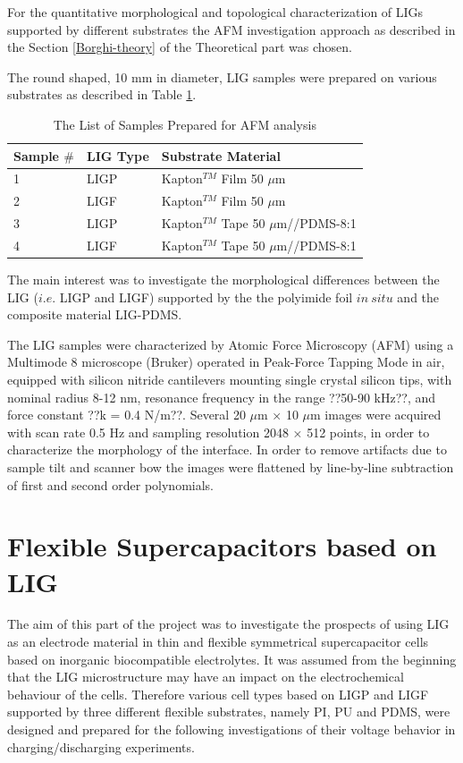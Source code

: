 For the quantitative morphological and topological characterization of LIGs supported by different substrates the AFM investigation approach as described in the Section \ref{Borghi-theory} of the Theoretical part was chosen.

The round shaped, 10 mm in diameter, LIG samples were prepared on  various substrates as described in Table \ref{tab:borghi_afm_samples}. 

\begin{table}[H]
\centering
    \caption{The List of Samples Prepared for AFM analysis}
    \label{tab:borghi_afm_samples} 
\medskip
\medskip
\begin{tabular}{ l | l | l } 


	Sample $\#$ & LIG Type\footnotemark[1] & Substrate Material \\ [13px]\hline
	1  & LIGP & Kapton$^{TM}$ Film 50 $\mu$m \\ [13px]
	2  & LIGF & Kapton$^{TM}$ Film 50 $\mu$m \\ [13px]\hline
	3  & LIGP & Kapton$^{TM}$ Tape 50 $\mu$m//PDMS-8:1 \\ [13px]
	4  & LIGF & Kapton$^{TM}$ Tape 50 $\mu$m//PDMS-8:1 \\ [13px]


\end{tabular}
\end{table}

The main interest was to investigate the morphological differences between the LIG ($i.e.$ LIGP and LIGF) supported by the the polyimide foil $in\:situ$ and the composite material LIG-PDMS.

The LIG samples were characterized by Atomic Force Microscopy (AFM) using a Multimode 8 microscope (Bruker) operated in Peak-Force Tapping Mode in air, equipped with silicon nitride cantilevers mounting single crystal silicon tips, with nominal radius 8-12 nm, resonance frequency in the range ??50-90 kHz??, and force constant ??k = 0.4 N/m??. Several 20 $\mu$m × 10 $\mu$m images were acquired with scan rate 0.5 Hz and sampling resolution 2048 × 512 points, in order to characterize the morphology of the interface. In order to remove artifacts due to sample tilt and scanner bow the images were flattened by line-by-line subtraction of first and second order polynomials. 


\section{Flexible Supercapacitors based on LIG}
The aim of this part of the project was to investigate the prospects of using LIG as an electrode material in thin and flexible symmetrical supercapacitor cells based on inorganic biocompatible electrolytes. It was assumed from the beginning that the LIG microstructure may have an impact on the electrochemical behaviour of the cells. Therefore various cell types based on LIGP and LIGF supported by three different flexible substrates, namely PI, PU and PDMS, were designed and prepared for the following investigations of their voltage behavior in charging/discharging experiments.

